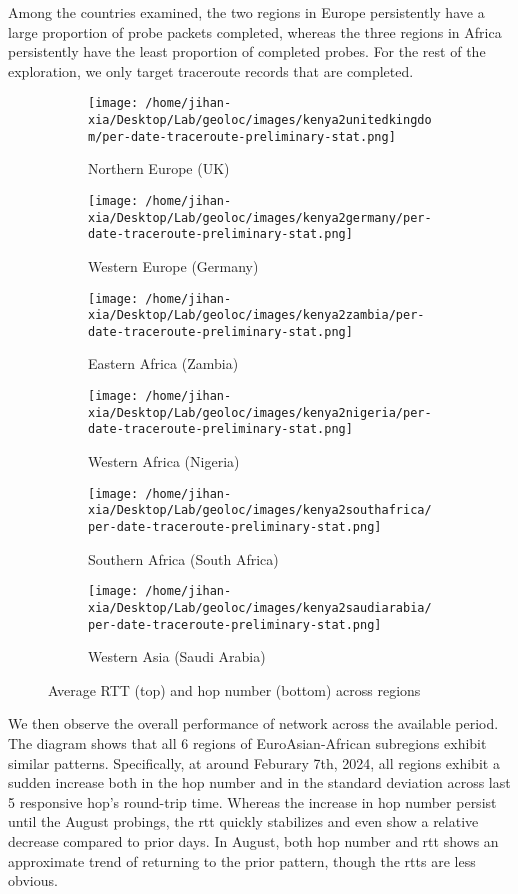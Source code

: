 \documentclass[twocolumn]{article}
\begin{document}
Among the countries examined, the two regions in Europe persistently have a large proportion of probe packets completed, whereas the three regions in Africa persistently have the least proportion of completed probes. For the rest of the exploration, we only target traceroute records that are completed.

\begin{figure}[!htbp]
  \centering
  \begin{subfigure}{0.24\textwidth}
    \centering
    \texttt{[image: /home/jihan-xia/Desktop/Lab/geoloc/images/kenya2unitedkingdom/per-date-traceroute-preliminary-stat.png]}
    \caption{Northern Europe (UK)}
  \end{subfigure}
  \begin{subfigure}{0.24\textwidth}
    \centering
    \texttt{[image: /home/jihan-xia/Desktop/Lab/geoloc/images/kenya2germany/per-date-traceroute-preliminary-stat.png]}
    \caption{Western Europe (Germany)}
  \end{subfigure}
  \begin{subfigure}{0.24\textwidth}
    \centering
    \texttt{[image: /home/jihan-xia/Desktop/Lab/geoloc/images/kenya2zambia/per-date-traceroute-preliminary-stat.png]}
    \caption{Eastern Africa (Zambia)}
  \end{subfigure}
  \begin{subfigure}{0.24\textwidth}
    \centering
    \texttt{[image: /home/jihan-xia/Desktop/Lab/geoloc/images/kenya2nigeria/per-date-traceroute-preliminary-stat.png]}
    \caption{Western Africa (Nigeria)}
  \end{subfigure}
  \begin{subfigure}{0.24\textwidth}
    \centering
    \texttt{[image: /home/jihan-xia/Desktop/Lab/geoloc/images/kenya2southafrica/per-date-traceroute-preliminary-stat.png]}
    \caption{Southern Africa (South Africa)}
  \end{subfigure}
  \begin{subfigure}{0.24\textwidth}
    \centering
    \texttt{[image: /home/jihan-xia/Desktop/Lab/geoloc/images/kenya2saudiarabia/per-date-traceroute-preliminary-stat.png]}
    \caption{Western Asia (Saudi Arabia)}
  \end{subfigure}
  \caption{Average RTT (top) and hop number (bottom) across regions}
  \label{fig:regionalstats}
\end{figure}
We then observe the overall performance of network across the available period. The diagram shows that all 6 regions of EuroAsian-African subregions exhibit similar patterns. Specifically, at around Feburary 7th, 2024, all regions exhibit a sudden increase both in the hop number and in the standard deviation across last 5 responsive hop's round-trip time. Whereas the increase in hop number persist until the August probings, the rtt quickly stabilizes and even show a relative decrease compared to prior days. In August, both hop number and rtt shows an approximate trend of returning to the prior pattern, though the rtts are less obvious.
\end{document}
